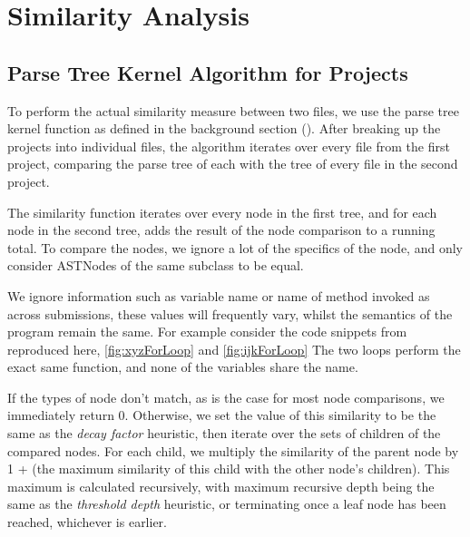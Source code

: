 \chapter{Similarity Analysis}

\section{Parse Tree Kernel Algorithm for Projects}

To perform the actual similarity measure between two files, we use the 
parse tree kernel function as defined in the background section ().
After breaking up the projects into individual files, 
the algorithm iterates over every file from the first project, comparing
the parse tree of each with the tree of every file in the second project. 

The similarity function iterates over every node in the first tree, and
for each node in the second tree, adds the result of the node comparison to
a running total. To compare the nodes, we ignore a lot of the specifics of
the node, and only consider ASTNodes of the same subclass to be equal.

We ignore information such as variable name or name of method invoked as
across submissions, these values will frequently vary, whilst the semantics
of the program remain the same. For example consider the code snippets from
 reproduced here, \cref{fig:xyzForLoop} and \cref{fig:ijkForLoop}
The two loops perform the exact same function, and none of the variables share
the name.

If the types of node don't match, as is the case for most node comparisons,
we immediately return 0. Otherwise, we set the value of this similarity to be
the same as the \emph{decay factor} heuristic, then iterate over the sets of children of the
compared nodes. For each child, we multiply the similarity of the parent node
by 1 + (the maximum similarity of this child with the other node's children).
This maximum is calculated recursively, with maximum recursive depth being
the same as the \emph{threshold depth} heuristic, or terminating once a leaf
node has been reached, whichever is earlier.

